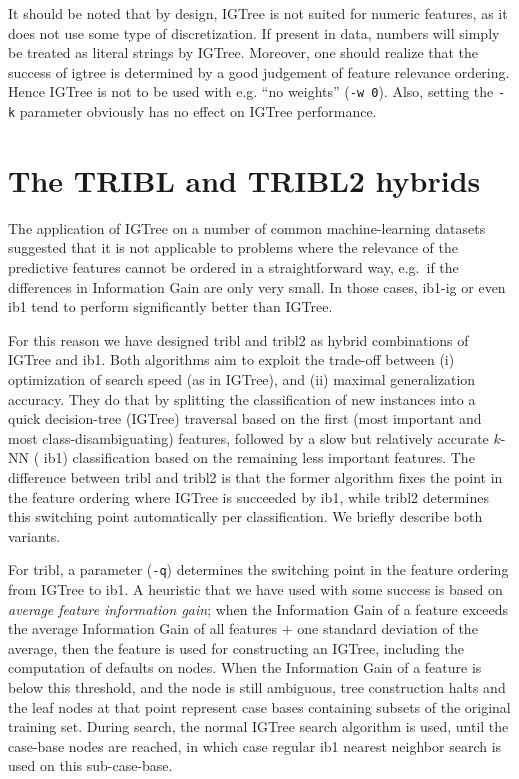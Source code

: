 \documentclass{book}
\begin{document}
It should be noted that by design, {\sc IGTree} is not suited for
numeric features, as it does not use some type of discretization. If
present in data, numbers will simply be treated as literal strings by
{\sc IGTree}. Moreover, one should realize that the success of {\sc
  igtree} is determined by a good judgement of feature relevance
ordering. Hence {\sc IGTree} is not to be used with e.g. ``no
weights'' ({\tt -w 0}). Also, setting the {\tt -k} parameter obviously
has no effect on {\sc IGTree} performance.

\section{The TRIBL and TRIBL2 hybrids}
\label{tribl}

The application of {\sc IGTree} on a number of common machine-learning
datasets suggested that it is not applicable to problems where the
relevance of the predictive features cannot be ordered in a
straightforward way, e.g.~if the differences in Information Gain are
only very small. In those cases, {\sc ib1-ig} or even {\sc ib1} tend
to perform significantly better than {\sc IGTree}.

For this reason we have designed {\sc tribl} \cite{Daelemans+97d} and
{\sc tribl2} as hybrid combinations of {\sc IGTree} and {\sc
ib1}. Both algorithms aim to exploit the trade-off between (i)
optimization of search speed (as in {\sc IGTree}), and (ii) maximal
generalization accuracy. They do that by splitting the classification
of new instances into a quick decision-tree ({\sc IGTree}) traversal
based on the first (most important and most class-disambiguating)
features, followed by a slow but relatively accurate $k$-NN ({\sc
ib1}) classification based on the remaining less important
features. The difference between {\sc tribl} and {\sc tribl2} is that
the former algorithm fixes the point in the feature ordering where
{\sc IGTree} is succeeded by {\sc ib1}, while {\sc tribl2} determines
this switching point automatically per classification. We briefly
describe both variants.

For {\sc tribl}, a parameter ({\tt -q}) determines the switching point
in the feature ordering from {\sc IGTree} to {\sc ib1}. A heuristic
that we have used with some success is based on {\em average feature
information gain}; when the Information Gain of a feature exceeds the
average Information Gain of all features $+$ one standard
deviation of the average, then the feature is used for constructing an
{\sc IGTree}, including the computation of defaults on nodes. When the
Information Gain of a feature is below this threshold, and the node is
still ambiguous, tree construction halts and the leaf nodes at that
point represent case bases containing subsets of the original training
set. During search, the normal {\sc IGTree} search algorithm is used,
until the case-base nodes are reached, in which case regular {\sc ib1}
nearest neighbor search is used on this sub-case-base.
\end{document}

